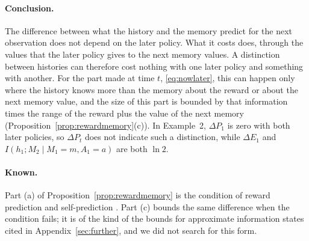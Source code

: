 \documentclass{article}
\theoremstyle{definition}
\newcommand{\dE}{\Delta E}
\newcommand{\dP}{\Delta P}
\begin{document}
\paragraph{Conclusion.} The difference between what the history and the memory predict for the next observation does not depend on the later policy. What it costs does, through the values that the later policy gives to the next memory values. A distinction between histories can therefore cost nothing with one later policy and something with another. For the part made at time $t$, \eqref{eq:nowlater}, this can happen only where the history knows more than the memory about the reward or about the next memory value, and the size of this part is bounded by that information times the range of the reward plus the value of the next memory (Proposition~\ref{prop:rewardmemory}(c)). In Example~2, $\dP_1$ is zero with both later policies, so $\dP_t$ does not indicate such a distinction, while $\dE_1$ and $I(h_1;M_2\mid M_1=m,A_1=a)$ are both $\ln2$.

\paragraph{Known.} Part (a) of Proposition~\ref{prop:rewardmemory} is the condition of reward prediction and self-prediction \citep{subramanian2022approximate,ni2024bridging}. Part (c) bounds the same difference when the condition fails; it is of the kind of the bounds for approximate information states cited in Appendix~\ref{sec:further}, and we did not search for this form.
\end{document}
